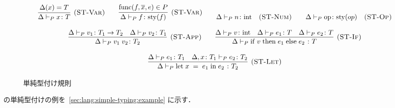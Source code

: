 \begin{figure}[h]
  \begin{align*}\begin{array}{c}
    \infer[\STRuleVar] {
      \StyJudge{P}{\Delta}{x}{T}
    } {
      \Delta\paren{x} = T
    }
    \quad\quad \infer[\STRuleVarFunc] {
      \StyJudge{P}{\Delta}{f}{\sty{f}}
    } {
      \Func{f}{\seq{x}}{e} \in P
    }
    \quad\quad \StyJudge{P}{\Delta}{n}{\StyInt} \quad\STRuleNum
    \quad\quad \StyJudge{P}{\Delta}{\mathrm{op}}{\sty{op}} \quad\STRuleOp \\\\
    \infer[\STRuleApp] {
      \StyJudge{P}{\Delta}{\App{v_1}{v_2}}{T_2}
    } {
      \StyJudge{P}{\Delta}{v_1}{\StyFunc{T_1}{T_2}}
      \quad \StyJudge{P}{\Delta}{v_2}{T_1}
    }
    \quad\quad \infer[\STRuleIf] {
      \StyJudge{P}{\Delta}{\If{\; v \;}{\; e_1 \;}{\; e_2 \;}}{T}
    } {
      \StyJudge{P}{\Delta}{v}{\StyInt}
      \quad \StyJudge{P}{\Delta}{e_1}{T}
      \quad \StyJudge{P}{\Delta}{e_2}{T}
    } \\\\
    \infer[\STRuleLet] {
      \StyJudge{P}{\Delta}{\Let{\; x \;}{\; e_1 \;}{\; e_2 \;}}{T_2}
    } {
      \StyJudge{P}{\Delta}{e_1}{T_1}
      \quad \StyJudge{P}{\Delta, \typed{x}{T_1}}{e_2}{T_2}
    }
  \end{array}\end{align*}
  \label{fig:lang:simple-type:rules}
  \caption{単純型付け規則}
\end{figure}

\par \Yil の単純型付けの例を~\ref{sec:lang:simple-typing:example} に示す．
